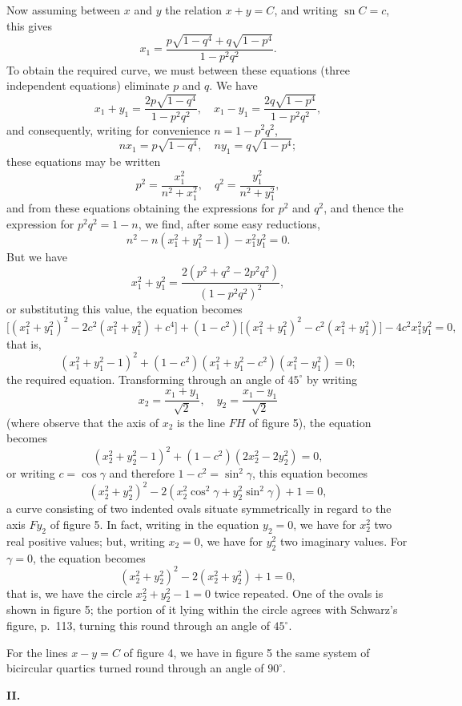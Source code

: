 \documentclass[11pt,a4paper]{book}
\begin{document}
Now assuming between $x$ and $y$ the relation $x + y = C$, and writing $\operatorname{sn} C = c$, this gives
\[
x_1 = \frac{p\sqrt{1-q^4} + q\sqrt{1-p^4}}{1-p^2q^2}.
\]
To obtain the required curve, we must between these equations (three independent
equations) eliminate $p$ and $q$. We have
\[
x_1 + y_1 = \frac{2p\sqrt{1-q^4}}{1-p^2q^2},
\quad
x_1 - y_1 = \frac{2q\sqrt{1-p^4}}{1-p^2q^2},
\]
and consequently, writing for convenience $n = 1 - p^2q^2$,
\[
nx_1 = p\sqrt{1-q^4}, \quad ny_1 = q\sqrt{1-p^4};
\]
these equations may be written
\[
p^2 = \frac{x_1^2}{n^2 + x_1^2}, \quad q^2 = \frac{y_1^2}{n^2 + y_1^2},
\]
and from these equations obtaining the expressions for $p^2$ and $q^2$, and thence the
expression for $p^2q^2 = 1 - n$, we find, after some easy reductions,
\[
n^2 - n(x_1^2 + y_1^2 - 1) - x_1^2y_1^2 = 0.
\]
But we have
\[
x_1^2 + y_1^2 = \frac{2(p^2 + q^2 - 2p^2q^2)}{(1-p^2q^2)^2},
\]
or substituting this value, the equation becomes
\[
\bigl[(x_1^2 + y_1^2)^2 - 2c^2(x_1^2 + y_1^2) + c^4\bigr] + (1-c^2)\bigl[(x_1^2 + y_1^2)^2 - c^2(x_1^2 + y_1^2)\bigr] - 4c^2x_1^2y_1^2 = 0,
\]
that is,
\[
(x_1^2 + y_1^2 - 1)^2 + (1-c^2)(x_1^2 + y_1^2 - c^2)(x_1^2 - y_1^2) = 0;
\]
the required equation. Transforming through an angle of $45^\circ$ by writing
\[
x_2 = \frac{x_1 + y_1}{\sqrt{2}}, \quad y_2 = \frac{x_1 - y_1}{\sqrt{2}}
\]
(where observe that the axis of $x_2$ is the line $FH$ of figure 5), the equation becomes
\[
(x_2^2 + y_2^2 - 1)^2 + (1-c^2)(2x_2^2 - 2y_2^2) = 0,
\]
or writing $c = \cos\gamma$ and therefore $1 - c^2 = \sin^2\gamma$, this equation becomes
\[
(x_2^2 + y_2^2)^2 - 2(x_2^2\cos^2\gamma + y_2^2\sin^2\gamma) + 1 = 0,
\]
a curve consisting of two indented ovals situate symmetrically in regard to the axis
$Fy_2$ of figure 5. In fact, writing in the equation $y_2 = 0$, we have for $x_2^2$ two real
positive values; but, writing $x_2 = 0$, we have for $y_2^2$ two imaginary values. For $\gamma=0$,
the equation becomes
\[
(x_2^2 + y_2^2)^2 - 2(x_2^2 + y_2^2) + 1 = 0,
\]
that is, we have the circle $x_2^2 + y_2^2 - 1 = 0$ twice repeated. One of the ovals is
shown in figure 5; the portion of it lying within the circle agrees with Schwarz's
figure, p.~113, turning this round through an angle of $45^\circ$.

For the lines $x - y = C$ of figure 4, we have in figure 5 the same system of
bicircular quartics turned round through an angle of $90^\circ$.

\bigskip
\textbf{II.}
\end{document}
